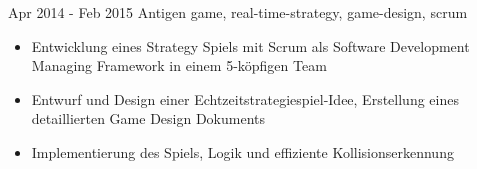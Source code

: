 \documentclass[letterpaper]{twentysecondcv_german} %
\begin{document}
\begin{twenty}
	\twentyitem
    		{Apr 2014 -}
		{Feb 2015}
        		{Antigen}
        		{}
        		{game, real-time-strategy, game-design, scrum}
        		{\begin{itemize}
	        		\item Entwicklung eines Strategy Spiels mit Scrum als Software Development Managing Framework in einem 5-köpfigen Team
        			\item Entwurf und Design einer Echtzeitstrategiespiel-Idee, Erstellung eines detaillierten Game Design Dokuments
        			\item Implementierung des Spiels, Logik und effiziente Kollisionserkennung
        		\end{itemize}}\\
\end{twenty}
\end{document}
